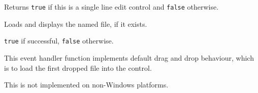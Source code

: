 Returns {\tt true} if this is a single line edit control and {\tt false}
otherwise.




\label{wxtextctrlloadfile}


Loads and displays the named file, if it exists.




{\tt true} if successful, {\tt false} otherwise.



\label{wxtextctrlondropfiles}


This event handler function implements default drag and drop behaviour, which
is to load the first dropped file into the control.




This is not implemented on non-Windows platforms.


